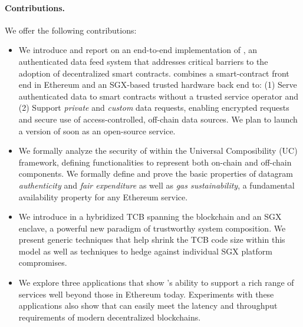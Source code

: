 \paragraph{\bf Contributions.}
We offer the following contributions:
\begin{itemize}[leftmargin=5mm]
\item
  \setlength{\itemsep}{2pt}
  \setlength{\parskip}{0pt}
  \setlength{\parsep}{0pt}
We introduce and report on an end-to-end implementation of \tcs, an authenticated data feed system that addresses critical barriers to the adoption of decentralized smart contracts. \tc combines a smart-contract front end in Ethereum and an SGX-based trusted hardware back end to: (1) Serve authenticated data to smart contracts without a trusted service operator and (2) Support {\em private} and {\em custom} data requests, enabling encrypted requests and secure use of access-controlled, off-chain data sources. We plan to launch a version of \tc soon as an open-source service.
\item We formally analyze the security of \tc within the Universal Composibility (UC) framework, defining functionalities to represent both on-chain and off-chain components. We formally define and prove the basic properties of datagram {\em authenticity} and {\em fair expenditure} as well as {\em gas sustainability}, a fundamental availability property for any Ethereum service. 
\item We introduce in \tc a hybridized TCB spanning the blockchain and an SGX enclave, a powerful new paradigm of trustworthy system composition. We present generic techniques that help shrink the TCB code size within this model as well as techniques to hedge against individual SGX platform compromises. 
\item We explore three \tc applications that show \tc's ability to support a rich range of services well beyond those in Ethereum today. Experiments with these applications also show that \tc can easily meet the latency and throughput requirements of modern decentralized blockchains. 

\end{itemize}





